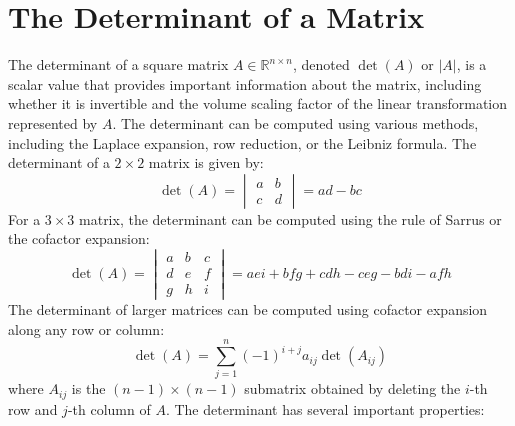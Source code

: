 \section{The Determinant of a Matrix}

The determinant of a square matrix \(A \in \mathbb{R}^{n \times n}\), denoted \(\det(A)\) or \(|A|\), is a scalar value that provides important information about the matrix, including whether it is invertible and the volume scaling factor of the linear transformation represented by \(A\).
The determinant can be computed using various methods, including the Laplace expansion, row reduction, or the Leibniz formula.
The determinant of a \(2 \times 2\) matrix is given by:
\begin{equation*}
\det(A) =
\begin{vmatrix}
a & b \\
c & d
\end{vmatrix}
= ad - bc
\end{equation*}
For a \(3 \times 3\) matrix, the determinant can be computed using the rule of Sarrus or the cofactor expansion:
\begin{equation*}
\det(A) =
\begin{vmatrix}
a & b & c \\
d & e & f \\
g & h & i
\end{vmatrix}
= aei + bfg + cdh - ceg - bdi - afh
\end{equation*}
The determinant of larger matrices can be computed using cofactor expansion along any row or column:
\begin{equation*}
\det(A) = \sum_{j=1}^{n} (-1)^{i+j} a_{ij} \det(A_{ij})
\end{equation*}
where \(A_{ij}\) is the \((n-1) \times (n-1)\) submatrix obtained by deleting the \(i\)-th row and \(j\)-th column of \(A\).
The determinant has several important properties:
